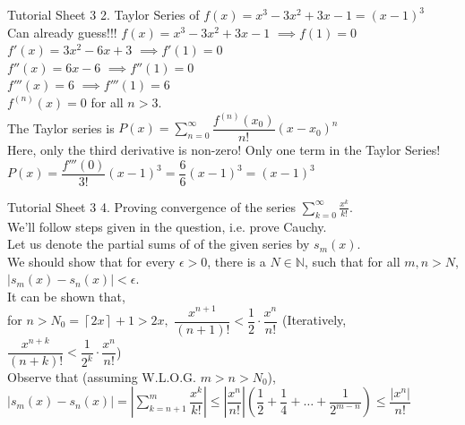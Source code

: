 \documentclass[aspectratio=169]{beamer}
\newcommand{\fc}[1]{\left\lceil #1 \right\rceil}
\begin{document}
\begin{frame}{Tutorial Sheet 3}
    2. Taylor Series of $f(x)=x^3-3x^2+3x-1 = (x-1)^3$ \\
    Can already guess!!! $f(x)=x^3-3x^2+3x-1$ $\implies f(1)=0$ \\
    \smallskip
    $f'(x)=3x^2-6x+3$ $\implies f'(1)=0$\\
    \smallskip
    $f''(x)=6x-6$   $\implies f''(1)=0$\\
    \smallskip
    $f'''(x)=6$ $\implies f'''(1)=6$\\
    \smallskip
    $f^{(n)}(x)=0$ for all $n>3$.  \\
    \medskip
    The Taylor series is $P(x)=\displaystyle \sum_{n=0}^{\infty}\dfrac{f^{(n)}(x_0)}{n!}(x-x_0)^n$ \\
    Here, only the third derivative is non-zero! Only one term in the Taylor Series! \\
    $P(x)=\dfrac{f'''(0)}{3!}(x-1)^3=\dfrac{6}{6}(x-1)^3=(x-1)^3$
\end{frame}

\begin{frame}{Tutorial Sheet 3}
    4. Proving convergence of the series $\displaystyle \sum_{k=0}^{\infty} \frac{x^k}{k!}$. \\
    \medskip
    We'll follow steps given in the question, i.e. prove Cauchy. \\
    \medskip
    Let us denote the partial sums of of the given series by $s_m(x)$. \\
    We should show that for every $\epsilon>0$, there is a $N \in \mathbb{N}$, such that for all $m, n > N $, $|s_m(x)-s_n(x)|<\epsilon$. \\
    \medskip
    It can be shown that, \\
    for $n>N_0=\fc{2x}+1>2x,$ \hspace{5pt} $\dfrac{x^{n+1}}{(n+1)!} < \dfrac{1}{2}\cdot\dfrac{x^n}{n!}$ (Iteratively, $\dfrac{x^{n+k}}{(n+k)!} < \dfrac{1}{2^k}\cdot\dfrac{x^n}{n!}$) \\
    \medskip
    Observe that (assuming W.L.O.G. $m>n>N_0$), \\
    $\displaystyle |s_m(x)-s_n(x)| = \left|\sum_{k=n+1}^{m} \dfrac{x^k}{k!}\right| \leq \left|\dfrac{x^n}{n!}\right|\left(\dfrac{1}{2} +\dfrac{1}{4} + \dots + \dfrac{1}{2^{m-n}} \right) \leq \dfrac{|x^n|}{n!}$
\end{frame}
\end{document}
